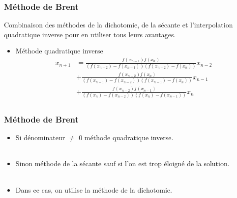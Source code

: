 \begin{frame}
\frametitle{Méthode de Brent}

Combinaison des méthodes de la dichotomie, de la sécante et l'interpolation quadratique inverse pour en utiliser tous leurs avantages.

   \begin{itemize}
      \item Méthode quadratique inverse
    \begin{equation}\begin{aligned}
         x_{n+1} &= \frac{f(x_{n-1})f(x_n)}{(f(x_{n-2})-f(x_{n-1}))(f(x_{n-2})-f(x_{n}))}x_{n-2} \\
         &+  \frac{f(x_{n-2})f(x_n)}{(f(x_{n-1})-f(x_{n-2}))(f(x_{n-1})-f(x_{n}))}x_{n-1} \\
         &+ \frac{f(x_{n-2})f(x_{n-1})}{(f(x_{n})-f(x_{n-2}))(f(x_{n})-f(x_{n-1}))}x_{n} \\
    \end{aligned}
    \end{equation}  
     

   \end{itemize}
\end{frame}



\begin{frame}
\frametitle{Méthode de Brent}

   \begin{itemize}
      \item Si dénominateur $\ne$ 0 méthode quadratique inverse.\\~\\
      \item Sinon méthode de la sécante sauf si l'on est trop éloigné de la solution.\\~\\
      \item Dans ce cas, on utilise la méthode de la dichotomie.
   \end{itemize}
\end{frame}



